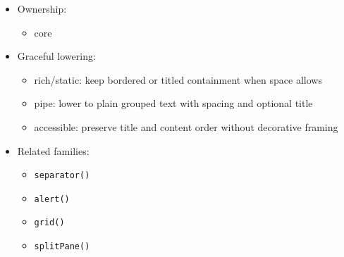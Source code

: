 \begin{itemize}
  \begin{itemize}
  \tightlist
  \item
    use \texttt{b\allowbreak{}o\allowbreak{}x\allowbreak{}(\allowbreak{})} for grouped content and \texttt{h\allowbreak{}e\allowbreak{}a\allowbreak{}d\allowbreak{}e\allowbreak{}r\allowbreak{}B\allowbreak{}o\allowbreak{}x\allowbreak{}(\allowbreak{})} when the region needs a clear title plus compact secondary detail
  \item
    titles should describe the region's job, not restate surrounding context
  \item
    \texttt{h\allowbreak{}e\allowbreak{}a\allowbreak{}d\allowbreak{}e\allowbreak{}r\allowbreak{}B\allowbreak{}o\allowbreak{}x\allowbreak{}(\allowbreak{})} detail text should carry terse metadata such as environment, path, version, or scope rather than a second sentence
  \item
    nested boxes should be rare and should explain real hierarchy or comparison, not just add more chrome
  \item
    keep dense prose out of narrow boxes unless wrapping materially helps comprehension
  \end{itemize}
\item
  Ownership:

  \begin{itemize}
  \tightlist
  \item
    core
  \end{itemize}
\item
  Graceful lowering:

  \begin{itemize}
  \tightlist
  \item
    rich/static: keep bordered or titled containment when space allows
  \item
    pipe: lower to plain grouped text with spacing and optional title
  \item
    accessible: preserve title and content order without decorative framing
  \end{itemize}
\item
  Related families:

  \begin{itemize}
  \tightlist
  \item
    \texttt{s\allowbreak{}e\allowbreak{}p\allowbreak{}a\allowbreak{}r\allowbreak{}a\allowbreak{}t\allowbreak{}o\allowbreak{}r\allowbreak{}(\allowbreak{})}
  \item
    \texttt{a\allowbreak{}l\allowbreak{}e\allowbreak{}r\allowbreak{}t\allowbreak{}(\allowbreak{})}
  \item
    \texttt{g\allowbreak{}r\allowbreak{}i\allowbreak{}d\allowbreak{}(\allowbreak{})}
  \item
    \texttt{s\allowbreak{}p\allowbreak{}l\allowbreak{}i\allowbreak{}t\allowbreak{}P\allowbreak{}a\allowbreak{}n\allowbreak{}e\allowbreak{}(\allowbreak{})}
  \end{itemize}
\end{itemize}

